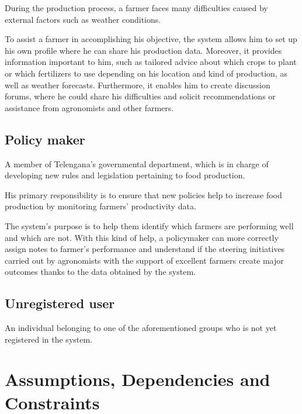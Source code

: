 During the production process, a farmer faces many difficulties caused by external factors such as weather conditions.

To assist a farmer in accomplishing his objective, the system allows him to set up his own profile where he can share his production data. Moreover, it provides information important to him, such as tailored advice about which crops to plant or which fertilizers to use depending on his location and kind of production, as well as weather forecasts. Furthermore, it enables him to create discussion forums, where he could share his difficulties and solicit recommendations or assistance from agronomists and other farmers.

\subsection{Policy maker}

A member of Telengana's governmental department, which is in charge of developing new rules and legislation pertaining to food production.

His primary responsibility is to ensure that new policies help to increase food production by monitoring farmers' productivity data.

The system's purpose is to help them identify which farmers are performing well and which are not. With this kind of help, a policymaker can more correctly assign notes to farmer's performance and understand if the steering initiatives carried out by agronomists with the support of excellent farmers create major outcomes thanks to the data obtained by the system.

\subsection{Unregistered user}

An individual belonging to one of the aforementioned groups who is not yet registered in the system.

\section{Assumptions, Dependencies and Constraints}

